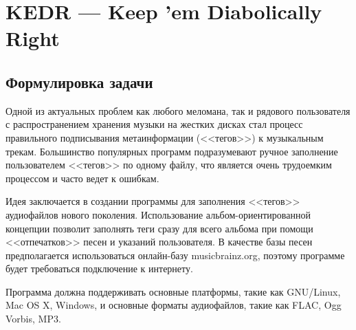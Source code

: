 \documentclass[a4paper,12pt,oneside]{article}
\begin{document}
\section*{KEDR --- Keep 'em Diabolically Right}
\subsection*{Формулировка задачи}

Одной из актуальных проблем как любого меломана, так и рядового
пользователя с распространением хранения музыки на жестких
дисках стал процесс правильного подписывания метаинформации (<<тегов>>) к
музыкальным трекам. Большинство популярных программ подразумевают ручное
заполнение пользователем <<тегов>> по одному файлу, что является очень
трудоемким процессом и часто ведет к ошибкам.

Идея заключается в создании программы для заполнения <<тегов>> аудиофайлов
нового поколения. Использование альбом-ориентированной концепции
позволит заполнять теги сразу для всего альбома при помощи
<<отпечатков>> песен и указаний пользователя. В качестве базы песен
предполагается использоваться онлайн-базу musicbrainz.org, поэтому
программе будет требоваться подключение к интернету.

Программа должна поддерживать основные платформы, такие как GNU/Linux, Mac OS X,
Windows, и основные форматы аудиофайлов, такие как FLAC, Ogg Vorbis,
MP3.
\end{document}
